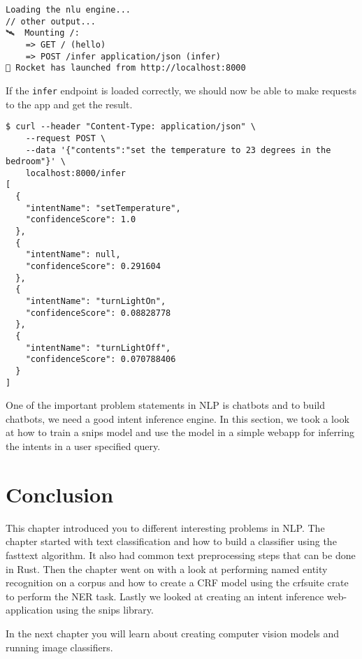 \documentclass{book}
\begin{document}
\begin{lstlisting}[caption={}, basicstyle=\small]
Loading the nlu engine...
// other output...
🛰  Mounting /:
    => GET / (hello)
    => POST /infer application/json (infer)
🚀 Rocket has launched from http://localhost:8000
\end{lstlisting}

If the \lstinline{infer} endpoint is loaded correctly, we should now be able to make requests to the app and get the result.

\begin{lstlisting}[caption={}, basicstyle=\tiny]
$ curl --header "Content-Type: application/json" \
	--request POST \
	--data '{"contents":"set the temperature to 23 degrees in the bedroom"}' \
	localhost:8000/infer
[
  {
    "intentName": "setTemperature",
    "confidenceScore": 1.0
  },
  {
    "intentName": null,
    "confidenceScore": 0.291604
  },
  {
    "intentName": "turnLightOn",
    "confidenceScore": 0.08828778
  },
  {
    "intentName": "turnLightOff",
    "confidenceScore": 0.070788406
  }
]
\end{lstlisting}

One of the important problem statements in NLP is chatbots and to build chatbots, we need a good intent inference engine. In this section, we took a look at how to train a snips model and use the model in a simple webapp for inferring the intents in a user specified query.

\label{sec:chatbots_and_natural_language_understanding}

\section{Conclusion}%

This chapter introduced you to different interesting problems in NLP. The chapter started with text classification and how to build a classifier using the fasttext algorithm. It also had common text preprocessing steps that can be done in Rust. Then the chapter went on with a look at performing named entity recognition on a corpus and how to create a CRF model using the crfsuite crate to perform the NER task. Lastly we looked at creating an intent inference web-application using the snips library.

In the next chapter you will learn about creating computer vision models and running image classifiers.
\label{sec:conclusion}

\printbibliography
\nocite{*}
\end{document}
